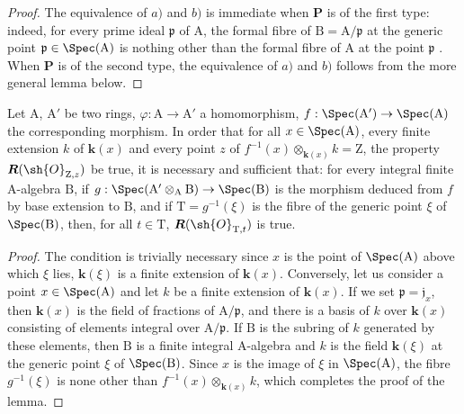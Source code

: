 \begin{proof}
The equivalence of $a)$ and $b)$ is immediate when $\boldsymbol{P}$ is of the first type: indeed, for every prime ideal $\mathfrak{p}$ of $\mathrm{A}$, the formal fibre of $\mathrm{B}=\mathrm{A}/\mathfrak{p}$ at the generic point $\mathfrak{p}\in\Spec(\mathrm{A})$ is nothing other than the formal fibre of $\mathrm{A}$ at the point $\mathfrak{p}$ .
When $\boldsymbol{P}$ is of the second type, the equivalence of $a)$ and $b)$ follows from the more general lemma below.
\end{proof}

\begin{lemma}[7.3.16.2]
\label{IV.7.3.16.2}
Let $\mathrm{A}$, $\mathrm{A}'$ be two rings, $\varphi:\mathrm{A}\to\mathrm{A}'$ a homomorphism, $f:\Spec(\mathrm{A}')\to\Spec(\mathrm{A})$ the corresponding morphism.
In order that for all $x\in\Spec(\mathrm{A})$, every finite extension $k$ of $\boldsymbol{k}(x)$ and every point $z$ of $f^{-1}(x)\otimes_{\boldsymbol{k}(x)} k=\mathrm{Z}$, the property $\boldsymbol{R}(\sh{O}_{\mathrm{Z},z})$ be true, it is necessary and sufficient that: for every integral finite A-algebra $\mathrm{B}$, if $g:\Spec(\mathrm{A}'\otimes_\mathrm{A}\mathrm{B})\to\Spec(\mathrm{B})$ is the morphism deduced from $f$ by base extension to $\mathrm{B}$, and if $\mathrm{T}=g^{-1}(\xi)$ is the fibre of the generic point $\xi$ of $\Spec(\mathrm{B})$, then, for all $t\in\mathrm{T}$, $\boldsymbol{R}(\sh{O}_{\mathrm{T},t})$ is true.
\end{lemma}

\begin{proof}
The condition is trivially necessary since $x$ is the point of $\Spec(\mathrm{A})$ above which $\xi$ lies, $\boldsymbol{k}(\xi)$ is a finite extension of $\boldsymbol{k}(x)$.
Conversely, let us consider a point $x\in\Spec(\mathrm{A})$ and let $k$ be a finite extension of $\boldsymbol{k}(x)$.
If we set $\mathfrak{p}=\mathfrak{j}_x$, then $\boldsymbol{k}(x)$ is the field of fractions of $\mathrm{A}/\mathfrak{p}$, and there is a basis of $k$ over $\boldsymbol{k}(x)$ consisting of elements integral over $\mathrm{A}/\mathfrak{p}$.
If $\mathrm{B}$ is the subring of $k$ generated by these elements, then $\mathrm{B}$ is a finite integral $\mathrm{A}$-algebra and $k$ is the field $\boldsymbol{k}(\xi)$ at the generic point $\xi$ of $\Spec(\mathrm{B})$.
Since $x$ is the image of $\xi$ in $\Spec(\mathrm{A})$, the fibre $g^{-1}(\xi)$ is none other than $f^{-1}(x)\otimes_{\boldsymbol{k}(x)}k$, which completes the proof of the lemma.
\end{proof}

